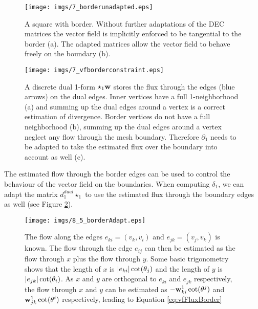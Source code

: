 \begin{figure}%
\texttt{[image: imgs/7\_borderunadapted.eps]}%
\caption{A square with border. Without further adaptations of the DEC matrices the vector field is implicitly enforced to be tangential to the border (a). The adapted matrices allow the vector field to behave freely on the boundary (b). }%
\label{fig:7_adaptedvsUnadapted}%
\end{figure}


\begin{figure}
\begin{center}
\texttt{[image: imgs/7\_vfborderconstraint.eps]}%
\end{center}
\caption{A discrete dual 1-form $\star_1\textbf{w}$ stores the flux through the edges (blue arrows) on the dual edges. Inner vertices have a full 1-neighborhood (a) and summing up the dual edges around a vertex is a correct estimation of divergence. Border vertices do not have a full neighborhood (b), summing up the dual edges around a vertex neglect any flow through the mesh boundary. Therefore $\partial_1$ needs to be adapted to take the estimated flux over the boundary into account as well (c).}%
\label{fig:vf_borderconstr}%
\end{figure}


The estimated flow through the border edges can be used to control the behaviour of the vector field on the boundaries. When computing $\delta_1$, we can adapt the matrix $d_1^{dual} \star_1$ to use the estimated flux through the boundary edges as well (see Figure \ref{fig:vf_borderconstr}).



\begin{figure}
\begin{center}
\texttt{[image: imgs/8\_5\_borderAdapt.eps]}
\end{center}
\caption{The flow along the edges $e_{ki}= (v_k,v_i)$ and $e_{jk} = (v_j, v_k)$ is known. The flow through the edge $e_{ij}$ can then be estimated as the flow through $x$ plus the flow through $y$. Some basic trigonometry shows that the length of $x$ is $\left| e_{ki} \right|\cot(\theta_j)$ and the length of $y$ is $\left| e_{jk} \right|\cot(\theta_i)$. As $x$ and $y$ are orthogonal to $e_{ki}$ and $e_{jk}$ respectively, the flow through $x$ and $y$ can be estimated as $-\textbf{w}^1_{ki} \cot(\theta^j)$ and $\textbf{w}^1_{jk} \cot(\theta^i)$ respectively, leading to Equation \ref{eq:vfFluxBorder}}
\label{fig:8_3_borderWeights}
\end{figure}


